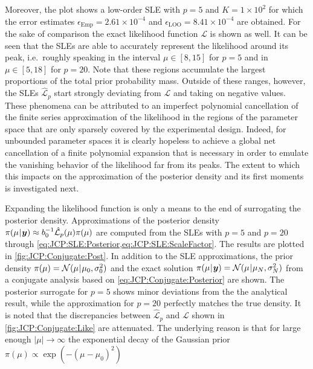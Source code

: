 Moreover, the plot shows a low-order SLE with \(p = 5\) and \(K = 1 \times 10^2\) for which the error estimates
\(\epsilon_{\mathrm{Emp}} = 2.61 \times 10^{-4}\) and \(\epsilon_{\mathrm{LOO}} = 8.41 \times 10^{-4}\) are obtained.
For the sake of comparison the exact likelihood function \(\mathcal{L}\) is shown as well.
It can be seen that the SLEs are able to accurately represent the likelihood around its peak,
i.e.\ roughly speaking in the interval \(\mu \in [8,15]\) for \(p = 5\) and in \(\mu \in [5,18]\) for \(p = 20\).
Note that these regions accumulate the largest proportions of the total prior probability mass.
Outside of these ranges, however, the SLEs \(\hat{\mathcal{L}}_p\) start strongly deviating from \(\mathcal{L}\) and taking on negative values.
These phenomena can be attributed to an imperfect polynomial cancellation of the finite series approximation of the likelihood
in the regions of the parameter space that are only sparsely covered by the experimental design.
Indeed, for unbounded parameter spaces it is clearly hopeless to achieve a global net cancellation of a finite polynomial expansion
that is necessary in order to emulate the vanishing behavior of the likelihood far from its peaks.
The extent to which this impacts on the approximation of the posterior density and its first moments is investigated next.
\par %
Expanding the likelihood function is only a means to the end of surrogating the posterior density.
Approximations of the posterior density \(\pi(\mu {\:\!}|{\:\!} \bm{y}) \approx b_0^{-1} \hat{\mathcal{L}}_p(\mu) \pi(\mu)\)
are computed from the SLEs with \(p = 5\) and \(p = 20\) through \cref{eq:JCP:SLE:Posterior,eq:JCP:SLE:ScaleFactor}.
The results are plotted in \cref{fig:JCP:Conjugate:Post}.
In addition to the SLE approximations, the prior density \(\pi(\mu) = \mathcal{N}(\mu {\:\!}|{\:\!} \mu_0,\sigma_0^2)\) and the exact solution
\(\pi(\mu {\:\!}|{\:\!} \bm{y}) = \mathcal{N}(\mu {\:\!}|{\:\!} \mu_N,\sigma_N^2)\) from a conjugate analysis based on \cref{eq:JCP:Conjugate:Posterior} are shown.
The posterior surrogate for \(p = 5\) shows minor deviations from the the analytical result,
while the approximation for \(p = 20\) perfectly matches the true density.
It is noted that the discrepancies between \(\hat{\mathcal{L}}_p\) and \(\mathcal{L}\) shown in \cref{fig:JCP:Conjugate:Like} are attenuated.
The underlying reason is that for large enough \(\lvert \mu \rvert \rightarrow \infty\) the exponential decay of the Gaussian prior \(\pi(\mu) \propto \exp(-(\mu-\mu_0)^2)\)
